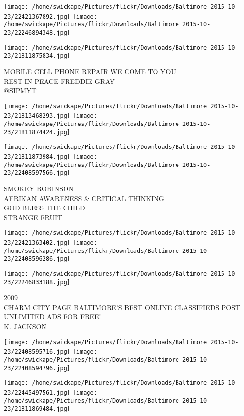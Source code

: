\documentclass[10pt,letterpaper]{article}
\begin{document}
\texttt{[image: /home/swickape/Pictures/flickr/Downloads/Baltimore 2015-10-23/22421367892.jpg]}
\texttt{[image: /home/swickape/Pictures/flickr/Downloads/Baltimore 2015-10-23/22246894348.jpg]}

\vspace{0.25in}
\texttt{[image: /home/swickape/Pictures/flickr/Downloads/Baltimore 2015-10-23/21811875834.jpg]}

MOBILE CELL PHONE REPAIR WE COME TO YOU!\\
REST IN PEACE FREDDIE GRAY\\
@SIPMYT\_
\pagebreak

\texttt{[image: /home/swickape/Pictures/flickr/Downloads/Baltimore 2015-10-23/21813468293.jpg]}
\texttt{[image: /home/swickape/Pictures/flickr/Downloads/Baltimore 2015-10-23/21811874424.jpg]}

\texttt{[image: /home/swickape/Pictures/flickr/Downloads/Baltimore 2015-10-23/21811873984.jpg]}
\texttt{[image: /home/swickape/Pictures/flickr/Downloads/Baltimore 2015-10-23/22408597566.jpg]}

SMOKEY ROBINSON\\
AFRIKAN AWARENESS \& CRITICAL THINKING\\
GOD BLESS THE CHILD\\
STRANGE FRUIT
\pagebreak

\texttt{[image: /home/swickape/Pictures/flickr/Downloads/Baltimore 2015-10-23/22421363402.jpg]}
\texttt{[image: /home/swickape/Pictures/flickr/Downloads/Baltimore 2015-10-23/22408596286.jpg]}

\vspace{0.25in}
\texttt{[image: /home/swickape/Pictures/flickr/Downloads/Baltimore 2015-10-23/22246833188.jpg]}

2009\\
CHARM CITY PAGE BALTIMORE'S BEST ONLINE CLASSIFIEDS POST UNLIMITED ADS FOR FREE!\\
K. JACKSON
\pagebreak

\texttt{[image: /home/swickape/Pictures/flickr/Downloads/Baltimore 2015-10-23/22408595716.jpg]}
\texttt{[image: /home/swickape/Pictures/flickr/Downloads/Baltimore 2015-10-23/22408594796.jpg]}

\texttt{[image: /home/swickape/Pictures/flickr/Downloads/Baltimore 2015-10-23/22445497561.jpg]}
\texttt{[image: /home/swickape/Pictures/flickr/Downloads/Baltimore 2015-10-23/21811869484.jpg]}
\end{document}
